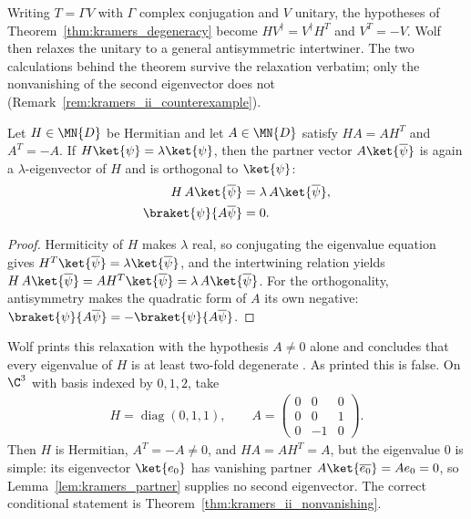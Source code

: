 Writing $T=\Gamma V$ with $\Gamma$ complex conjugation and $V$ unitary, the
hypotheses of Theorem~\ref{thm:kramers_degeneracy} become
$HV^\dagger=V^\dagger H^T$ and $V^T=-V$.  Wolf then relaxes the unitary to a
general antisymmetric intertwiner.  The two calculations behind the theorem
survive the relaxation verbatim; only the nonvanishing of the second
eigenvector does not (Remark~\ref{rem:kramers_ii_counterexample}).

\begin{lemma}
    \label{lem:kramers_partner}
    \leanok
    Let $H\in\MN{D}$ be Hermitian and let $A\in\MN{D}$ satisfy $HA=AH^{T}$ and
    $A^{T}=-A$.  If $H\ket{\psi}=\lambda\ket{\psi}$, then the partner vector
    $A\ket{\overline\psi}$ is again a $\lambda$-eigenvector of $H$ and is
    orthogonal to $\ket{\psi}$:
    \begin{align}
        H\,A\ket{\overline\psi}       & =\lambda\,A\ket{\overline\psi}, \\
        \braket{\psi}{A\overline\psi} & =0.
    \end{align}
\end{lemma}

\begin{proof}\leanok
    Hermiticity of $H$ makes $\lambda$ real, so conjugating the eigenvalue
    equation gives $H^{T}\ket{\overline\psi}=\lambda\ket{\overline\psi}$, and
    the intertwining relation yields
    $H\,A\ket{\overline\psi}=AH^{T}\ket{\overline\psi}
        =\lambda\,A\ket{\overline\psi}$.  For the orthogonality, antisymmetry makes
    the quadratic form of $A$ its own negative:
    $\braket{\psi}{A\overline\psi}=-\braket{\psi}{A\overline\psi}$.
\end{proof}

\begin{remark}
    \label{rem:kramers_ii_counterexample}
    Wolf prints this relaxation with the hypothesis $A\neq0$ alone and
    concludes that every eigenvalue of $H$ is at least two-fold degenerate
    \cite[Chapter~3, Theorem~3.2]{Wolf2012Quantum}.  As printed this is
    false.  On $\C^3$ with basis indexed by $0,1,2$, take
    \begin{align}
        H=\operatorname{diag}(0,1,1),\qquad
        A=
        \begin{pmatrix}
            0 & 0  & 0 \\
            0 & 0  & 1 \\
            0 & -1 & 0
        \end{pmatrix}.
    \end{align}
    Then $H$ is Hermitian, $A^{T}=-A\neq0$, and $HA=AH^{T}=A$, but the
    eigenvalue $0$ is simple: its eigenvector $\ket{e_0}$ has vanishing partner
    $A\ket{\overline{e_0}}=Ae_0=0$, so Lemma~\ref{lem:kramers_partner} supplies
    no second eigenvector.  The correct conditional statement is
    Theorem~\ref{thm:kramers_ii_nonvanishing}.
\end{remark}

